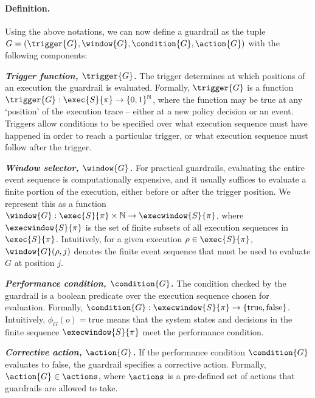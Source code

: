 \paragraph{Definition.}
Using the above notations, we can now define a guardrail as the tuple
\( G = (\trigger{G}, \window{G}, \condition{G}, \action{G}) \)
with the following components:

\begin{denseitemize}

\item {\it \textbf{Trigger function, $\trigger{G}$.}} The trigger determines at which positions of an execution the guardrail is evaluated. 
Formally, $\trigger{G}$ is a function
\( \trigger{G}: \exec{S}{\pi} \rightarrow \{0, 1\}^{\mathbb{N}} \),
where the function may be true at any `position' of the execution trace -- either at a new policy decision or an event.
Triggers allow conditions to be specified over what execution sequence must have happened in order to reach a particular trigger, or what execution sequence must follow after the trigger.

\item {\it \textbf{Window selector, $\window{G}$.}} For practical guardrails, evaluating the entire event sequence is computationally expensive, and it usually suffices to evaluate a finite portion of the execution, either before or after the trigger position.
We represent this as a function
\( \window{G}: \exec{S}{\pi} \times \mathbb{N} \rightarrow \execwindow{S}{\pi} \),
where $\execwindow{S}{\pi}$ is the set of finite subsets of all execution sequences in $\exec{S}{\pi}$.  
Intuitively, for a given execution $\rho \in \exec{S}{\pi}$, $\window{G}(\rho, j)$ denotes the finite event sequence that must be used to evaluate $G$ at position $j$. 

\item {\it \textbf{Performance condition, $\condition{G}$.}} 
The condition checked by the guardrail is a boolean predicate over the execution sequence chosen for evaluation.
Formally,
\( \condition{G} : \execwindow{S}{\pi} \rightarrow \{\mathrm{true},\mathrm{false}\} \).
Intuitively, $\phi_G(o)=\mathrm{true}$ means that the system states and decisions in the finite sequence $\execwindow{S}{\pi}$ meet the performance condition.

\item {\it \textbf{Corrective action, $\action{G}$.}}
If the performance condition $\condition{G}$ evaluates to false, the guardrail specifies a corrective action.
Formally,
\( \action{G} \in \actions \),
where $\actions$ is a pre-defined set of actions that guardrails are allowed to take.

\end{denseitemize}

